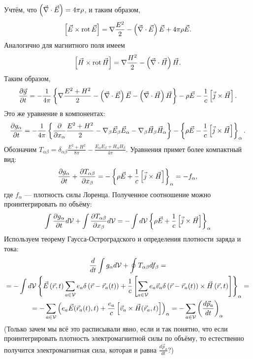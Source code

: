    Учтём, что $\left({\vec{\nabla}\cdot\vec{E}}\right) = 4\pi\rho$, и таким образом,
    \[
        \left[{\vec{E} \times \operatorname{rot}\vec{E}}\right] = \nabla\frac{E^2}{2} -  \left({\vec{\nabla}\cdot\vec{E}}\right)\vec{E} + 4\pi\rho\vec{E}.
    \]
    Аналогично для магнитного поля имеем
    \[
        \left[{\vec{H} \times \operatorname{rot}\vec{H}}\right] = \nabla\frac{H^2}{2} -  \left({\vec{\nabla}\cdot\vec{H}}\right)\vec{H}.
    \]
    Таким образом,
    \[
        \frac{\partial\vec{g}}{\partial t} = -\frac{1}{4\pi}
        \left\{{\nabla\frac{E^2 + H^2}{2} -  \left({\vec{\nabla}\cdot\vec{E}}\right)\vec{E} - \left({\vec{\nabla}\cdot\vec{H}}\right)\vec{H}}\right\} - \rho\vec{E} -\frac{1}{c}\left[{\vec{j}\times\vec{H}}\right].
    \]
    Это же уравнение в компонентах:
    \[
        \frac{\partial g_{\alpha}}{\partial t}
        = -\frac{1}{4\pi}
        \left\{{\frac{\partial}{\partial x_{\alpha}}\frac{E^2 + H^2}{2} - \nabla_{\beta}\vec{E}_{\beta}\vec{E}_{\alpha} - \nabla_{\beta}\vec{H}_{\beta}\vec{H}_{\alpha}}\right\}
        - \left\{{\rho\vec{E} -\frac{1}{c}\left[{\vec{j}\times\vec{H}}\right]}\right\}_{\alpha}.
    \]
    Обозначим $\displaystyle T_{\alpha\beta} = \delta_{\alpha\beta}\frac{E^2 + H^2}{8\pi} - \frac{E_{\alpha}E_{\beta} + H_{\alpha}H_{\beta}}{4\pi}$.
    Уравнения примет более компактный вид:
    \[
        \frac{\partial g_{\alpha}}{\partial t} + \frac{\partial T_{\alpha\beta}}{\partial x_{\beta}} =
        -\left\{{\rho\vec{E} + \frac 1c \left[{\vec{j}\times\vec{H}}\right]}\right\}_{\alpha} = -f_{\alpha},
    \]
    где $f_{\alpha}$ --- плотность силы Лоренца. Полученное соотношение можно проинтегрировать по объёму:
    \[
        \int \frac{\partial g_{\alpha}}{\partial t} d\mathcal{V} + \int\frac{\partial T_{\alpha\beta}}{\partial x_{\beta}} d\mathcal{V} = -\int d\mathcal{V} \left\{{\rho\vec{E} + \frac 1c \left[{\vec{j}\times\vec{H}}\right]}\right\}_{\alpha}
    \]
    Используем теорему Гаусса-Остроградского и определения плотности заряда и тока:
    \begin{gather*}
        \frac{d}{dt} \int g_{\alpha}d\mathcal{V} + \oint T_{\alpha\beta}df_{\beta} = \\
        = -\int d\mathcal{V} \left\{{\vec{E}\left({\vec{r}, t}\right)\sum_{a\in\mathcal{V}} e_a\delta\left({\vec{r} - \vec{r}_a(t)}\right)
        + \frac{1}{c}\left[{\sum_{a\in\mathcal{V}} e_a\vec{v}_a\delta\left({\vec{r} - \vec{r}_a(t)}\right) \times \vec{H}\left({\vec{r}, t}\right)}\right]}\right\}_{\alpha} = \\
        = -\sum_{a\in\mathcal{V}} \left({e_a\vec{E}(\vec{r}_a(t), t) + \frac{e_a}{c}\left[{\vec{v}_a \times \vec{H}(\vec{r}_a, t)}\right]}\right)_{\alpha}
        = -\sum_{a\in\mathcal{V}} \left({\frac{d\vec{p}_a}{dt}}\right)_{\alpha}
    \end{gather*}
    (Только зачем мы всё это расписывали явно, если и так понятно, что если проинтегрировать плотность электромагнитной силы по объёму,
    то естественно получится электромагнитная сила, которая и равна $\frac{d\vec{p}_a}{dt}$?)

